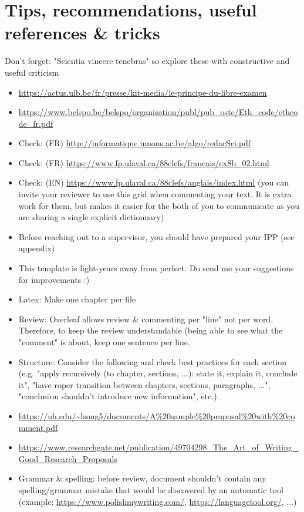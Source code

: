 \chapter{Tips, recommendations, useful references \& tricks}
Don't forget: "Scientia vincere tenebras"  so explore these with constructive and useful criticism
\begin{itemize}
    \item \url{https://actus.ulb.be/fr/presse/kit-media/le-principe-du-libre-examen}
    \item \url{https://www.belspo.be/belspo/organisation/publ/pub_ostc/Eth_code/ethcode_fr.pdf}
    \item Check: (FR) \url{http://informatique.umons.ac.be/algo/redacSci.pdf}
    \item Check: (FR) \url{https://www.fp.ulaval.ca/88clefs/francais/ex8b_02.html}
    \item Check: (EN) \url{https://www.fp.ulaval.ca/88clefs/anglais/index.html} (you can invite your reviewer to use this grid when commenting your text. It is extra work for them, but makes it easier for the both of you to communicate as you are sharing a single explicit dictionnary)
    \item Before reaching out to a supervisor, you should have prepared your IPP (see appendix)
    \item This template is light-years away from perfect. Do send me your suggestions for improvements :)
    \item Latex: Make one chapter per file
    \item Review: Overleaf allows review & commenting per "line" not per word. Therefore, to keep the review understandable (being able to see what the "comment" is about, keep one sentence per line.
    \item Structure: Consider the following and check best practices for each section (e.g. "apply recursively (to chapter, sections, ...): state it, explain it, conclude it", "have roper transition between chapters, sections, paragraphs, ...", "conclusion shouldn't introduce new information", etc.)
    \item \url{https://uh.edu/~lsong5/documents/A%20sample%20proposal%20with%20comment.pdf}
    \item \url{https://www.researchgate.net/publication/49704298_The_Art_of_Writing_Good_Research_Proposals}
    \item Grammar & spelling: before review, document shouldn't contain any spelling/grammar mistake that would be discovered by an automatic tool (example: \url{https://www.polishmywriting.com/}, \url{https://languagetool.org/}, ...)

\end{itemize}
